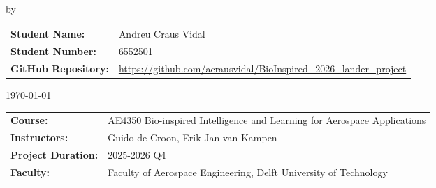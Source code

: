 \begin{titlepage}

    \begin{center}

        {\makeatletter
            \largetitlestyle\fontsize{40}{40}\selectfont\@title
            \makeatother}

        {\makeatletter
            \ifdefvoid{\@subtitle}{}{\bigskip\titlestyle\fontsize{18}{18}\selectfont\@subtitle}
            \makeatother}

        \bigskip
        \bigskip

        by

        \bigskip
        \bigskip

        {\makeatletter
            \largetitlestyle\fontsize{22}{22}\selectfont\@author
            \makeatother}

        \bigskip
        \bigskip

        \setlength\extrarowheight{3pt}
        \begin{tabular}{ll}
            \textbf{Student Name:}      & Andreu Craus Vidal                                                   \\
            \textbf{Student Number:}    & 6552501                                                              \\
            \textbf{GitHub Repository:} & \url{https://github.com/acrausvidal/BioInspired_2026_lander_project} \\
        \end{tabular}

        \bigskip
        \bigskip

        \reportdate\today

        \vfill


        \begin{tabular}{ll}
            \textbf{Course:}           & AE4350 Bio-inspired Intelligence and Learning for Aerospace Applications \\
            \textbf{Instructors:}      & Guido de Croon, Erik-Jan van Kampen                                      \\
            \textbf{Project Duration:} & 2025-2026 Q4                                                             \\
            \textbf{Faculty:}          & Faculty of Aerospace Engineering, Delft University of Technology         \\
        \end{tabular}


\end{center}
\end{titlepage}
